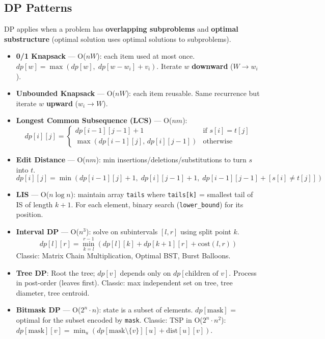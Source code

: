 \subsection{DP Patterns}

DP applies when a problem has \textbf{overlapping subproblems} and \textbf{optimal substructure} (optimal solution uses optimal solutions to subproblems).

\begin{itemize}
    \item \textbf{0/1 Knapsack} — O($nW$): each item used at most once.
          $dp[w] = \max(dp[w],\; dp[w - w_i] + v_i)$. Iterate $w$ \textbf{downward} ($W \to w_i$).

    \item \textbf{Unbounded Knapsack} — O($nW$): each item reusable.
          Same recurrence but iterate $w$ \textbf{upward} ($w_i \to W$).

    \item \textbf{Longest Common Subsequence (LCS)} — O($nm$):
          \[ dp[i][j] = \begin{cases} dp[i-1][j-1]+1 & \text{if } s[i]=t[j] \\ \max(dp[i-1][j],\,dp[i][j-1]) & \text{otherwise} \end{cases} \]

    \item \textbf{Edit Distance} — O($nm$): min insertions/deletions/substitutions to turn $s$ into $t$.
          \[ dp[i][j] = \min\!\left(dp[i-1][j]+1,\; dp[i][j-1]+1,\; dp[i-1][j-1] + [s[i] \neq t[j]]\right) \]

    \item \textbf{LIS} — O($n \log n$): maintain array \texttt{tails} where \texttt{tails[k]} = smallest tail of IS of length $k+1$. For each element, binary search (\texttt{lower\_bound}) for its position.

    \item \textbf{Interval DP} — O($n^3$): solve on subintervals $[l, r]$ using split point $k$.
          \[ dp[l][r] = \min_{k=l}^{r-1}\!\left(dp[l][k] + dp[k+1][r] + \text{cost}(l,r)\right) \]
          Classic: Matrix Chain Multiplication, Optimal BST, Burst Balloons.

    \item \textbf{Tree DP}: Root the tree; $dp[v]$ depends only on $dp[\text{children of }v]$. Process in post-order (leaves first). Classic: max independent set on tree, tree diameter, tree centroid.

    \item \textbf{Bitmask DP} — O($2^n \cdot n$): state is a subset of elements.
          $dp[\text{mask}]$ = optimal for the subset encoded by \texttt{mask}.
          Classic: TSP in O($2^n \cdot n^2$): $dp[\text{mask}][v] = \min_u(dp[\text{mask}\setminus\{v\}][u] + \text{dist}[u][v])$.


\end{itemize}

